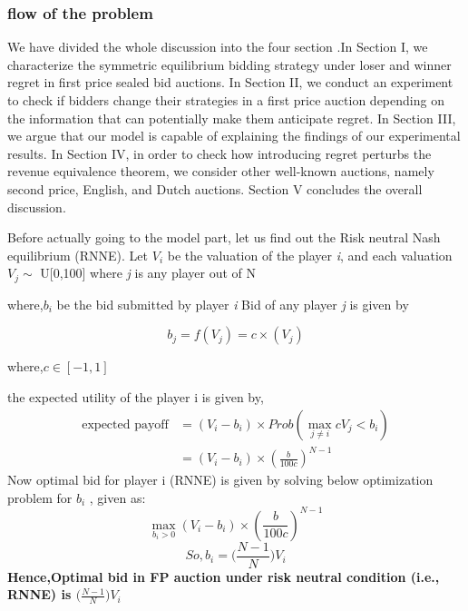 \documentclass[10pt,a4paper,oneside]{report}
\begin{document}
\subsubsection{flow of the problem}
We have divided the whole discussion into the four section .In Section I, we characterize the symmetric equilibrium bidding strategy under loser and winner regret in first price sealed bid auctions. In Section II, we conduct an experiment to check if bidders change their strategies in a first price auction depending on the information that can potentially make them anticipate regret. In Section III, we argue that our model is capable of explaining the findings of our experimental results. In Section IV, in order to check how introducing regret perturbs the revenue equivalence theorem, we consider other well-known auctions, namely second
price, English, and Dutch auctions. Section V concludes the overall discussion.

\noindent Before actually going to the model part, let us find out the Risk neutral Nash equilibrium (RNNE).
Let $V_i$ be the valuation of the player \textit{i}, and each valuation $V_j\sim$ U[0,100] where \textit{j} is any player out of N
  \begin{flushleft}
 where,$b_i$ be the bid submitted by player \textit{i}
       Bid of any player \textit{j} is given by 
       \end{flushleft}
       \begin{equation*}       
     b_j = f(V_j) = c\times(V_j)       
       \end{equation*}
    \begin{flushright}
    where,$c\in [-1,1]$ 
    \end{flushright}
    the expected utility of the player i is given by, 
\begin{align}
\nonumber
\text{expected payoff} &= (V_i-b_i)\times Prob(\max_{j\neq i}cV_j < b_i)\\
\nonumber
&= (V_i-b_i)\times (\frac{b}{100c})^{N-1}
\end{align}	
Now optimal bid for player i (RNNE) is given by solving below optimization problem for $b_i$ , given as:
\begin{equation*}
\max_{b_i>0}(V_i-b_i)\times(\frac{b}{100c})^{N-1}
\end{equation*}
\begin{equation*}
So,b_i = \big(\frac{N-1}{N}\big)V_i
\end{equation*}
\citep{dong2014double} \textbf{Hence,Optimal bid in FP auction under risk neutral condition (i.e., RNNE) is {$\big(\frac{N-1}{N}\big)V_i$}}
\end{document}
